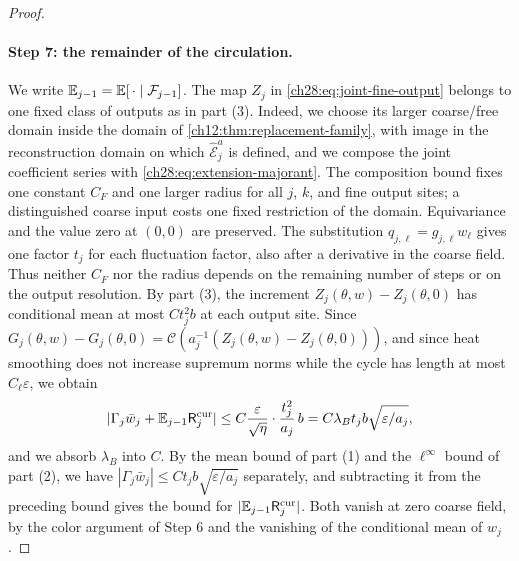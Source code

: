 \begin{proof}
\paragraph{Step 7: the remainder of the circulation.}
We write $\mathbb E_{j-1}=\mathbb E[\,\cdot\mid\mathcal F_{j-1}]$. The map $Z_j$ in \eqref{ch28:eq:joint-fine-output} belongs to one fixed class of outputs as in part (3). Indeed, we choose its larger coarse/free domain inside the domain of \cref{ch12:thm:replacement-family}, with image in the reconstruction domain on which $\widehat{\mathcal E}_j^a$ is defined, and we compose the joint coefficient series with \eqref{ch28:eq:extension-majorant}. The composition bound fixes one constant $C_F$ and one larger radius for all $j$, $k$, and fine output sites; a distinguished coarse input costs one fixed restriction of the domain. Equivariance and the value zero at $(0,0)$ are preserved. The substitution $q_{j,\ell}=g_{j,\ell}w_\ell$ gives one factor $t_j$ for each fluctuation factor, also after a derivative in the coarse field. Thus neither $C_F$ nor the radius depends on the remaining number of steps or on the output resolution. By part (3), the increment $Z_j(\theta,w)-Z_j(\theta,0)$ has conditional mean at most $Ct_j^2b$ at each output site. Since $G_j(\theta,w)-G_j(\theta,0)=\mathscr C(a_j^{-1}(Z_j(\theta,w)-Z_j(\theta,0)))$, and since heat smoothing does not increase supremum norms while the cycle has length at most $C_\ell\varepsilon$, we obtain
\[
 |\Gamma_j\bar w_j+\mathbb E_{j-1}\mathsf R_j^{\rm cur}|\le C\frac{\varepsilon}{\sqrt\eta}\cdot\frac{t_j^2}{a_j}\,b=C\lambda_Bt_jb\sqrt{\varepsilon/a_j},
\]
and we absorb $\lambda_B$ into $C$. By the mean bound of part (1) and the $\ell^\infty$ bound of part (2), we have $|\Gamma_j\bar w_j|\le Ct_jb\sqrt{\varepsilon/a_j}$ separately, and subtracting it from the preceding bound gives the bound for $|\mathbb E_{j-1}\mathsf R_j^{\rm cur}|$. Both vanish at zero coarse field, by the color argument of Step 6 and the vanishing of the conditional mean of $w_j$.


\end{proof}
